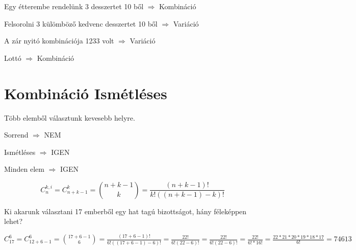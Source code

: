 \documentclass[paper=a4,
fontsize=2.2mm]{scrartcl} \addtokomafont{sectioning}{\rmfamily}
\begin{document}
Egy étterembe rendelünk 3 desszertet 10 ből $\Rightarrow$ Kombináció

Felsorolni 3 külömböző kedvenc desszertet 10 ből $\Rightarrow$ Variáció

A zár nyitó kombinációja 1233 volt $\Rightarrow$ Variáció

Lottó $\Rightarrow$ Kombináció


\section{Kombináció Ismétléses}

Több elemből választunk kevesebb helyre.

Sorrend $\Rightarrow$ NEM

Ismétléses $\Rightarrow$ IGEN

Minden elem $\Rightarrow$ IGEN


$$C_n^{k, i} = C_{n + k -1}^k = {{n + k - 1}\choose{k}} = \frac{(n + k - 1)!}{k!((n + k - 1) - k)!} $$


Ki akarunk választani 17 emberből egy hat tagú bizottságot, hány féleképpen lehet?

$C_{17}^6 = C_{12 + 6 - 1}^6 = {{17 + 6 - 1}\choose{6}} = \frac{(17 + 6 - 1)!}{6!((17 + 6 - 1) - 6)!} = \frac{22!}{6!(22 - 6)!} = \frac{22!}{6!(22 - 6)!} = \frac{22!}{6! * 16!} = \frac{22 * 21 * 20 * 19 * 18 * 17}{6!} = 74613 $
\end{document}

